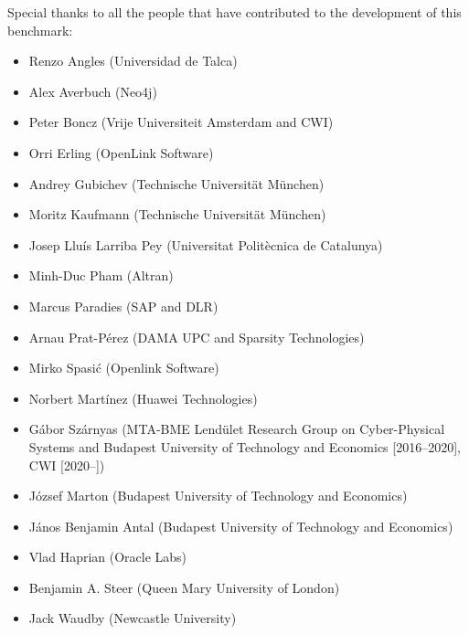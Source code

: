 Special thanks to all the people that have contributed to the development of this benchmark:
\begin{itemize}
  \item Renzo Angles (Universidad de Talca)
  \item Alex Averbuch (Neo4j)
  \item Peter Boncz (Vrije Universiteit Amsterdam and CWI)
  \item Orri Erling (OpenLink Software)
  \item Andrey Gubichev (Technische Universit\"at M\"unchen)
  \item Moritz Kaufmann (Technische Universit\"at M\"unchen)
  \item Josep Llu\'is Larriba Pey (Universitat Polit\`ecnica de Catalunya)
  \item Minh-Duc Pham (Altran)
  \item Marcus Paradies (SAP and DLR)
  \item Arnau Prat-P\'erez (DAMA UPC and Sparsity Technologies)
  \item Mirko Spasi\'c (Openlink Software)
  \item Norbert Mart\'inez (Huawei Technologies)
  \item G\'abor Sz\'arnyas (MTA-BME Lend\"ulet Research Group on Cyber-Physical Systems and Budapest University of Technology and Economics [2016--2020], CWI [2020--])
  \item J\'ozsef Marton (Budapest University of Technology and Economics)
  \item J\'anos Benjamin Antal (Budapest University of Technology and Economics)
  \item Vlad Haprian (Oracle Labs)
  \item Benjamin A. Steer (Queen Mary University of London)
  \item Jack Waudby (Newcastle University)
\end{itemize}
